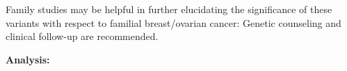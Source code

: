 \documentclass[10pt]{article}
\begin{document}

Family studies may be helpful in further elucidating the significance of these variants with respect to familial breast/ovarian cancer: Genetic counseling and clinical follow-up are recommended.

{\bf Analysis:}
\end{document}
